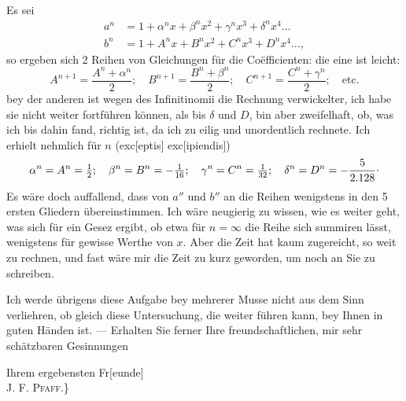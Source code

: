 \par\indent Es sei
\[
\begin{aligned}
a^n&=1+\alpha^n x+\beta^n x^2+\gamma^n x^3+\delta^n x^4\ldots\phantom{,}\\
b^n&=1+A^n x+B^n x^2+C^n x^3+D^n x^4\ldots,
\end{aligned}
\]
\noindent so ergeben sich 2 Reihen von Gleichungen für die Coëfficienten: die eine ist leicht:
\[
A^{n+1}=\frac{A^n+\alpha^n}{2};\quad
B^{n+1}=\frac{B^n+\beta^n}{2};\quad
C^{n+1}=\frac{C^n+\gamma^n}{2};\quad\text{etc.}
\]
\noindent bey der anderen ist wegen des Infinitinomii die Rechnung verwickelter, ich habe sie nicht weiter fortführen können, als bis $\delta$ und $D$, bin aber zweifelhaft, ob, was ich bis dahin fand, richtig ist, da ich zu eilig und unordentlich rechnete. Ich erhielt nehmlich für  $n$ (exc[eptis] exc[ipiendis])
\[
\alpha^n=A^n=\tfrac12;\quad
\beta^n=B^n=-\tfrac1{16};\quad
\gamma^n=C^n=\tfrac1{32};\quad
\delta^n=D^n=-\frac5{2.128}\mathpunct{\raisebox{.5ex}{.}}
\]
\noindent Es wäre doch auffallend, dass von $a''$ und $b''$ an die Reihen wenigstens in den 5 ersten Gliedern übereinstimmen. Ich wäre neugierig zu wissen, wie es weiter geht, was sich für ein Gesez ergibt, ob etwa für $n=\infty$ die Reihe sich summiren lässt, wenigstens für gewisse Werthe von $x$. Aber die Zeit hat kaum zugereicht, so weit zu rechnen, und fast wäre mir die Zeit zu kurz geworden, um noch an Sie zu schreiben.

\par\indent Ich werde übrigens diese Aufgabe bey mehrerer Musse nicht aus dem Sinn verliehren, ob gleich diese Untersuchung, die weiter führen kann, bey Ihnen in guten Händen ist. — Erhalten Sie ferner Ihre freundschaftlichen, mir sehr schätzbaren Gesinnungen
\begin{flushright}
Ihrem ergebensten Fr[eunde]\\
\textsc{J. F. Pfaff.}\}
\end{flushright}
\clearpage
\endgroup
